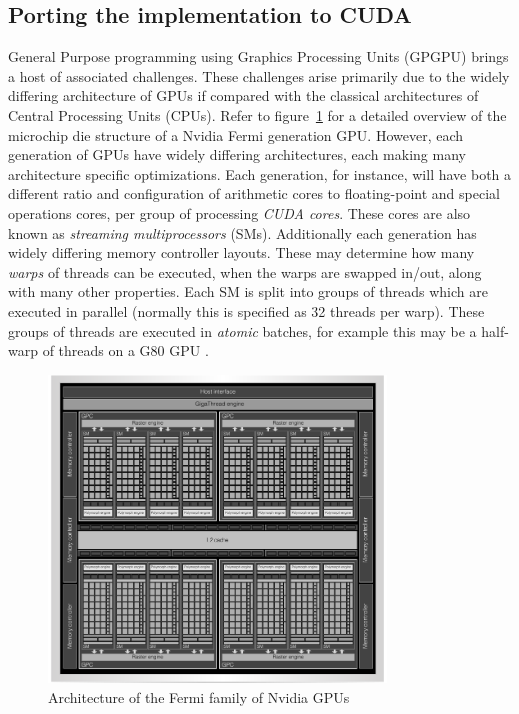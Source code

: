\subsection{Porting the implementation to CUDA}
General Purpose programming using Graphics Processing Units (GPGPU) brings a host of associated challenges. These challenges arise primarily due to the widely differing architecture of GPUs if compared
with the classical architectures of Central Processing Units (CPUs). Refer to figure~\ref{FERMI_ARCH} for a detailed overview of the microchip die structure of a Nvidia Fermi generation GPU. 
However, each generation of GPUs have widely differing architectures, each making many architecture specific optimizations. Each generation, for instance, will have both a 
different ratio and configuration of arithmetic cores to floating-point and special operations cores, per group of processing \textit{CUDA cores}. These cores are also known as 
\textit{streaming multiprocessors} (SMs). Additionally each generation has widely differing memory controller layouts. These may determine how many \textit{warps} of threads can be executed, when 
the warps are swapped in/out, along with many other properties. Each SM is split into groups of threads which are executed in parallel (normally this is specified as 32 threads per warp). 
These groups of threads are executed in \emph{atomic} batches, for example this may be a half-warp of threads on a G80 GPU \cite{harris2007parallel}.

\begin{figure}[h!]
\begin{mdframed}
 \centering
 \includegraphics[width=0.8\textwidth]{fermi_arch.png}
 \caption{Architecture of the Fermi family of Nvidia GPUs \cite{wittenbrink2011fermi}}
 \label{FERMI_ARCH}
\end{mdframed}
\end{figure}

